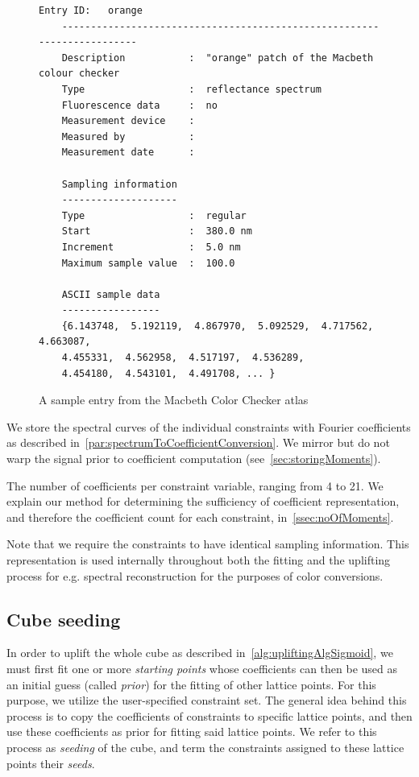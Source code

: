\begin{figure}
	\begin{lstlisting}[label=lst:atlasEntry]
	Entry ID:   orange
	------------------------------------------------------------------------
	Description           :  "orange" patch of the Macbeth colour checker
	Type                  :  reflectance spectrum
	Fluorescence data     :  no
	Measurement device    :  
	Measured by           :  
	Measurement date      :  
	
	Sampling information
	--------------------
	Type	    	      :  regular
	Start                 :  380.0 nm
	Increment             :  5.0 nm
	Maximum sample value  :  100.0
	
	ASCII sample data
	-----------------
	{6.143748,  5.192119,  4.867970,  5.092529,  4.717562,  4.663087, 
	4.455331,  4.562958,  4.517197,  4.536289,
	4.454180,  4.543101,  4.491708, ... }
	\end{lstlisting}
	\caption{A sample entry from the Macbeth Color Checker atlas}
	\label{fig:macbethSampleText}
\end{figure}

We store the spectral curves of the individual constraints with Fourier coefficients as described in~\cref{par:spectrumToCoefficientConversion}. We mirror but do not warp the signal prior to coefficient computation (see~\cref{sec:storingMoments}).

The number of coefficients per constraint variable, ranging from 4 to 21. We explain our method for determining the sufficiency of coefficient representation, and therefore the coefficient count for each constraint, in~\cref{ssec:noOfMoments}.

Note that we require the constraints to have identical sampling information. This representation is used internally throughout both the fitting and the uplifting process for e.g. spectral reconstruction for the purposes of color conversions.

\subsection{Cube seeding} \label{ssec:cubeSeeding}

In order to uplift the whole cube as described in~\cref{alg:upliftingAlgSigmoid}, we must first fit one or more \emph{starting points} whose coefficients can then be used as an initial guess (called \emph{prior}) for the fitting of other lattice points. For this purpose, we utilize the user-specified constraint set. The general idea behind this process is to copy the coefficients of constraints to specific lattice points, and then use these coefficients as prior for fitting said lattice points. We refer to this process as \emph{seeding} of the cube, and term the constraints assigned to these lattice points their \emph{seeds}.

